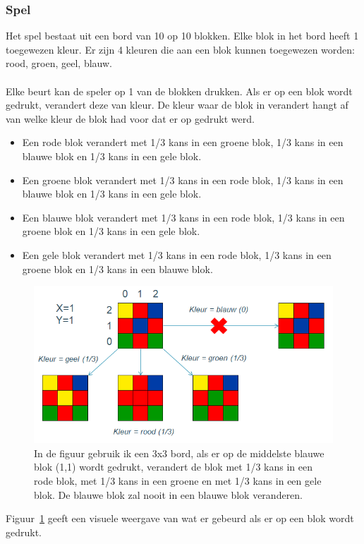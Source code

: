 \documentclass[12pt,a4paper,oneside]{book}
\begin{document}
\subsubsection{Spel}
Het spel bestaat uit een bord van 10 op 10 blokken. Elke blok in het bord heeft 1 toegewezen kleur. Er zijn 4 kleuren die aan een blok kunnen toegewezen worden: rood, groen, geel, blauw.\\\\
Elke beurt kan de speler op 1 van de blokken drukken. Als er op een blok wordt gedrukt, verandert deze van kleur. De kleur waar de blok in verandert hangt af van welke kleur de blok had voor dat er op gedrukt werd.
\begin{itemize}
  \item Een rode blok verandert met 1/3 kans in een groene blok, 1/3 kans in een blauwe blok en 1/3 kans in een gele blok.
  \item Een groene blok verandert met 1/3 kans in een rode blok, 1/3 kans in een blauwe blok en 1/3 kans in een gele blok.
  \item Een blauwe blok verandert met 1/3 kans in een rode blok, 1/3 kans in een groene blok en 1/3 kans in een gele blok.
  \item Een gele blok verandert met 1/3 kans in een rode blok, 1/3 kans in een groene blok en 1/3 kans in een blauwe blok.
\end{itemize}
\begin{figure}
  \centering
    \includegraphics[height=55truemm]{game_change_blocks}
  \caption{In de figuur gebruik ik een 3x3 bord, als er op de middelste blauwe blok (1,1) wordt gedrukt, verandert de blok met 1/3 kans in een rode blok, met 1/3 kans in een groene en met 1/3 kans in een gele blok. De blauwe blok zal nooit in een blauwe blok veranderen. }
  \label{fig:game_change_blocks}
\end{figure}
Figuur~\ref{fig:game_change_blocks} geeft een visuele weergave van wat er gebeurd als er op een blok wordt gedrukt.\\\\
\end{document}
